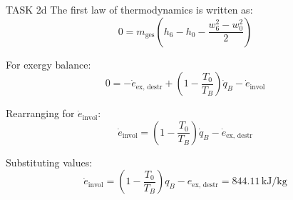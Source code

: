 TASK 2d  
The first law of thermodynamics is written as:  
\[
0 = m_{\text{ges}} (h_6 - h_0 - \frac{w_6^2 - w_0^2}{2})
\]

For exergy balance:  
\[
0 = -\dot{e}_{\text{ex, destr}} + \left(1 - \frac{T_0}{T_B}\right) \dot{q}_B - \dot{e}_{\text{invol}}
\]

Rearranging for \( \dot{e}_{\text{invol}} \):  
\[
\dot{e}_{\text{invol}} = \left(1 - \frac{T_0}{T_B}\right) \dot{q}_B - \dot{e}_{\text{ex, destr}}
\]

Substituting values:  
\[
\dot{e}_{\text{invol}} = \left(1 - \frac{T_0}{T_B}\right) q_B - e_{\text{ex, destr}} = 844.11 \, \text{kJ/kg}
\]